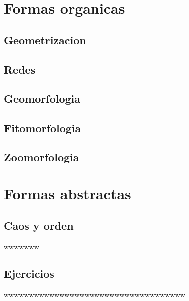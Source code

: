 \documentclass[
  16pt,
]{krantz}
\theoremstyle{definition}
\theoremstyle{definition}
\theoremstyle{definition}
\theoremstyle{definition}
\theoremstyle{remark}
\begin{document}
\hypertarget{formas-organicas}{%
\chapter{Formas organicas}\label{formas-organicas}}

\hypertarget{geometrizacion}{%
\section{Geometrizacion}\label{geometrizacion}}

\hypertarget{redes}{%
\section{Redes}\label{redes}}

\hypertarget{geomorfologia}{%
\section{Geomorfologia}\label{geomorfologia}}

\hypertarget{fitomorfologia}{%
\section{Fitomorfologia}\label{fitomorfologia}}

\hypertarget{zoomorfologia}{%
\section{Zoomorfologia}\label{zoomorfologia}}

\hypertarget{formas-abstractas}{%
\chapter{Formas abstractas}\label{formas-abstractas}}

\hypertarget{caos-y-orden}{%
\section{Caos y orden}\label{caos-y-orden}}

\citep{bookdown2016}wwwwwww \citep{vincze2014college}

\hypertarget{ejercicios}{%
\section{Ejercicios}\label{ejercicios}}

wwwwwwwwwwwwwwwwwwwwwwwwwwwwwwwwwwww
\end{document}
